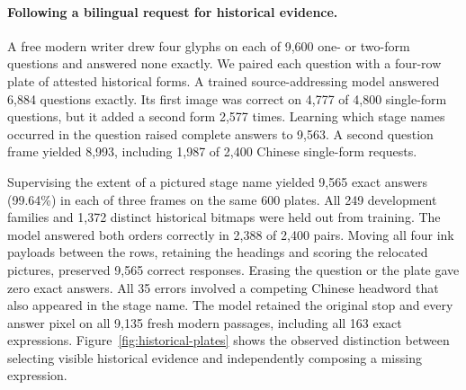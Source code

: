 \paragraph{Following a bilingual request for historical evidence.}
A free modern writer drew four glyphs on each of 9,600 one- or two-form questions and answered none exactly. We paired each question with a four-row plate of attested historical forms. A trained source-addressing model answered 6,884 questions exactly. Its first image was correct on 4,777 of 4,800 single-form questions, but it added a second form 2,577 times. Learning which stage names occurred in the question raised complete answers to 9,563. A second question frame yielded 8,993, including 1,987 of 2,400 Chinese single-form requests.

Supervising the extent of a pictured stage name yielded 9,565 exact answers (99.64\%) in each of three frames on the same 600 plates. All 249 development families and 1,372 distinct historical bitmaps were held out from training. The model answered both orders correctly in 2,388 of 2,400 pairs. Moving all four ink payloads between the rows, retaining the headings and scoring the relocated pictures, preserved 9,565 correct responses. Erasing the question or the plate gave zero exact answers. All 35 errors involved a competing Chinese headword that also appeared in the stage name. The model retained the original stop and every answer pixel on all 9,135 fresh modern passages, including all 163 exact expressions. Figure~\ref{fig:historical-plates} shows the observed distinction between selecting visible historical evidence and independently composing a missing expression.

